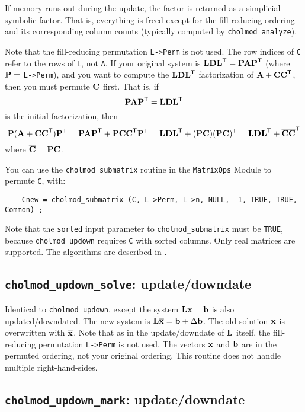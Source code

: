 \documentclass[11pt]{article}
\newcommand{\m}[1]{{\bf{#1}}}       %
\newcommand{\tr}{^{\sf T}}          %
\newcommand{\new}[1]{\overline{#1}}
\begin{document}
If memory runs out during the update, the factor is returned as a simplicial
symbolic factor.  That is, everything is freed except for the fill-reducing
ordering and its corresponding column counts (typically computed by
{\tt cholmod\_analyze}).

Note that the fill-reducing permutation {\tt L->Perm} is not used.  The row
indices of {\tt C} refer to the rows of {\tt L}, not {\tt A}.  If your original system is
$\m{LDL}\tr = \m{PAP}\tr$ (where $\m{P} =$ {\tt L->Perm}), and you want to compute the $\m{LDL}\tr$
factorization of $\m{A}+\m{CC}\tr$, then you must permute $\m{C}$ first.  That is,
if
\[
    \m{PAP}\tr = \m{LDL}\tr
\]
is the initial factorization, then
\[
\m{P}(\m{A}+\m{CC}\tr)\m{P}\tr
    = \m{PAP}\tr+\m{PCC}\tr\m{P}\tr
    = \m{LDL}\tr + (\m{PC})(\m{PC})\tr
    = \m{LDL}\tr + \new{\m{C}}\new{\m{C}}\tr
\]
where $\new{\m{C}} = \m{PC}$.

You can use the {\tt cholmod\_submatrix} routine in the {\tt MatrixOps} Module
to permute {\tt C}, with:
\begin{verbatim}
    Cnew = cholmod_submatrix (C, L->Perm, L->n, NULL, -1, TRUE, TRUE, Common) ;
\end{verbatim}

Note that the {\tt sorted} input parameter to {\tt cholmod\_submatrix} must be {\tt TRUE},
because {\tt cholmod\_updown} requires {\tt C} with sorted columns.
Only real matrices are supported.
The algorithms are described in \cite{DavisHager99,DavisHager01}.

\subsection{{\tt cholmod\_updown\_solve}: update/downdate}


Identical to {\tt cholmod\_updown}, except
the system $\m{Lx}=\m{b}$ is also updated/downdated.
The new system is $\new{\m{L}}\new{\m{x}}=\m{b} + \Delta \m{b}$.  The old solution $\m{x}$ is overwritten
with $\new{\m{x}}$.  Note that as in the update/downdate of $\m{L}$ itself, the fill-
reducing permutation {\tt L->Perm} is not used.  The vectors $\m{x}$ and $\m{b}$ are in the permuted
ordering, not your original ordering.  This routine does not handle multiple right-hand-sides.

\subsection{{\tt cholmod\_updown\_mark}: update/downdate}
\end{document}
